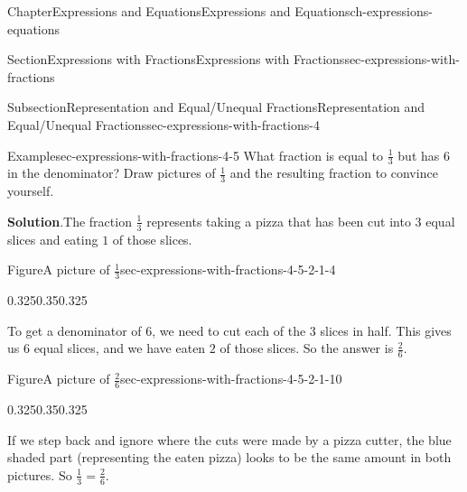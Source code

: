 \documentclass[twoside,11pt,]{book}
\newcommand{\blocktitlefont}{\relax}
\numberwithin{equation}{chapter}
\begin{document}
\begin{chapterptx}{Chapter}{Expressions and Equations}{}{Expressions and Equations}{}{}{ch-expressions-equations}
\begin{sectionptx}{Section}{Expressions with Fractions}{}{Expressions with Fractions}{}{}{sec-expressions-with-fractions}
\begin{subsectionptx}{Subsection}{Representation and Equal\slash{}Unequal Fractions}{}{Representation and Equal\slash{}Unequal Fractions}{}{}{sec-expressions-with-fractions-4}
\begin{example}{Example}{}{sec-expressions-with-fractions-4-5}%
What fraction is equal to \(\frac13\) but has \(6\) in the denominator? Draw pictures of \(\frac13\) and the resulting fraction to convince yourself.%
\par\smallskip%
\noindent\textbf{\blocktitlefont Solution}.\hypertarget{sec-expressions-with-fractions-4-5-2}{}\quad{}The fraction \(\frac13\) represents taking a pizza that has been cut into \(3\) equal slices and eating \(1\) of those slices. \begin{figureptx}{Figure}{A picture of \(\frac13\)}{sec-expressions-with-fractions-4-5-2-1-4}{}%
\begin{image}{0.325}{0.35}{0.325}{}%
%
\end{image}%
\tcblower
\end{figureptx}%
 To get a denominator of \(6\), we need to cut each of the \(3\) slices in half. This gives us \(6\) equal slices, and we have eaten \(2\) of those slices. So the answer is \(\frac26\). \begin{figureptx}{Figure}{A picture of \(\frac26\)}{sec-expressions-with-fractions-4-5-2-1-10}{}%
\begin{image}{0.325}{0.35}{0.325}{}%
%
\end{image}%
\tcblower
\end{figureptx}%
 If we step back and ignore where the cuts were made by a pizza cutter, the blue shaded part (representing the eaten pizza) looks to be the same amount in both pictures. So \(\frac13=\frac26\).%

\end{example}
\end{subsectionptx}
\end{sectionptx}
\end{chapterptx}
\end{document}
